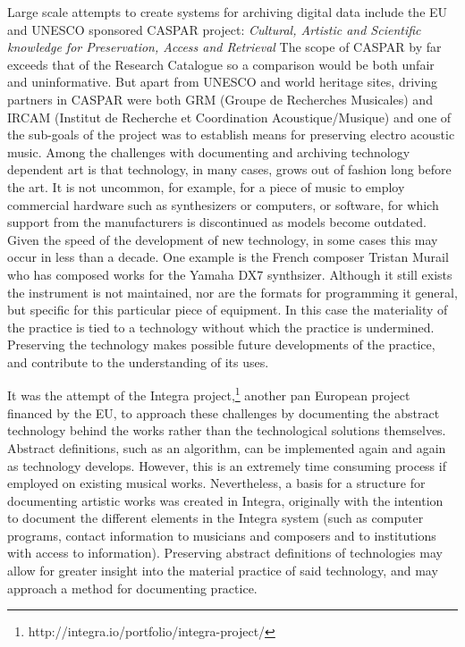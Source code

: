 \documentclass[11pt,a4paper]{article}
\begin{document}
Large scale attempts to create systems for archiving digital data include the EU and UNESCO sponsored CASPAR project: \emph{Cultural, Artistic and Scientific knowledge for Preservation, Access and Retrieval} \citep{Douglas2007,Roeder2006,Bachimont:03,cuervo2011} The scope of CASPAR by far exceeds that of the Research Catalogue so a comparison would be both unfair and uninformative. But apart from UNESCO and world heritage sites, driving partners in CASPAR were both GRM (Groupe de Recherches Musicales) and IRCAM (Institut de Recherche et Coordination Acoustique/Musique) and one of the sub-goals of the project was to establish means for preserving electro acoustic music. Among the challenges with documenting and archiving technology dependent art is that technology, in many cases, grows out of fashion long before the art. It is not uncommon, for example, for a piece of music to employ commercial hardware such as synthesizers or computers, or software, for which support from the manufacturers is discontinued as models become outdated. Given the speed of the development of new technology, in some cases this may occur in less than a decade. One example is the French composer Tristan Murail who has composed works for the Yamaha DX7 synthsizer. Although it still exists the instrument is not maintained, nor are the formats for programming it general, but specific for this particular piece of equipment.
In this case the materiality of the practice is tied to a technology without which the practice is undermined. Preserving the technology makes possible future developments of the practice, and contribute to the understanding of its uses.

It was the attempt of the Integra project,\footnote{http://integra.io/portfolio/integra-project/} another pan European project financed by the EU, to approach these challenges by documenting the abstract technology behind the works rather than the technological solutions themselves. Abstract definitions, such as an algorithm, can be implemented again and again as technology develops. However, this is an extremely time consuming process if employed on existing musical works. Nevertheless, a basis for a structure for documenting artistic works was created in Integra, originally with the intention to document the different elements in the Integra system (such as computer programs, contact information to musicians and composers and to institutions with access to information). Preserving abstract definitions of technologies may allow for greater insight into the material practice of said technology, and may approach a method for documenting practice.
\end{document}
